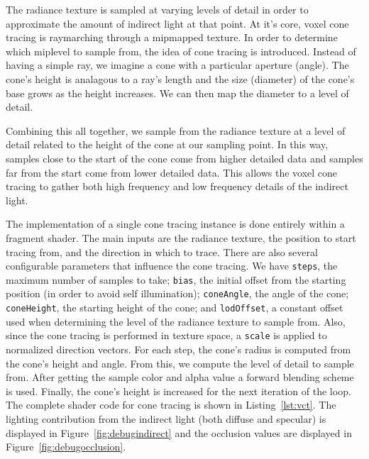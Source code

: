 The radiance texture is sampled at varying levels of detail in order to approximate the amount of indirect light at that point. At it's core, voxel cone tracing is raymarching through a mipmapped texture. In order to determine which miplevel to sample from, the idea of cone tracing is introduced. Instead of having a simple ray, we imagine a cone with a particular aperture (angle). The cone's height is analagous to a ray's length and the size (diameter) of the cone's base grows as the height increases. We can then map the diameter to a level of detail.

Combining this all together, we sample from the radiance texture at a level of detail related to the height of the cone at our sampling point. In this way, samples close to the start of the cone come from higher detailed data and samples far from the start come from lower detailed data. This allows the voxel cone tracing to gather both high frequency and low frequency details of the indirect light.

The implementation of a single cone tracing instance is done entirely within a fragment shader. The main inputs are the radiance texture, the position to start tracing from, and the direction in which to trace. There are also several configurable parameters that influence the cone tracing. We have \texttt{steps}, the maximum number of samples to take; \texttt{bias}, the initial offset from the starting position (in order to avoid self illumination); \texttt{coneAngle}, the angle of the cone; \texttt{coneHeight}, the starting height of the cone; and \texttt{lodOffset}, a constant offset used when determining the level of the radiance texture to sample from. Also, since the cone tracing is performed in texture space, a \texttt{scale} is applied to normalized direction vectors. For each step, the cone's radius is computed from the cone's height and angle. From this, we compute the level of detail to sample from. After getting the sample color and alpha value a forward blending scheme is used. Finally, the cone's height is increased for the next iteration of the loop. The complete shader code for cone tracing is shown in Listing~\ref{lst:vct}. The lighting contribution from the indirect light (both diffuse and specular) is displayed in Figure~\ref{fig:debugindirect} and the occlusion values are displayed in Figure~\ref{fig:debugocclusion}.

